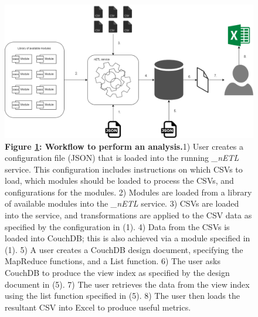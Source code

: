 \begin{figure}[ht]
    \centering
    \begin{mdframed}
        \centering
        \includegraphics[scale=0.35]{./resources/figures/analysis-workflow.png}
    \end{mdframed}
    \caption[Analysis Workflow]{\textbf{Figure \ref{analysis-workflow}: Workflow to perform an analysis.}1) User creates a configuration file (JSON) that is loaded into the running \textit{\_nETL} service. This configuration includes instructions on which CSVs to load, which modules should be loaded to process the CSVs, and configurations for the modules. 2) Modules are loaded from a library of available modules into the \textit{\_nETL} service. 3) CSVs are loaded into the service, and transformations are applied to the CSV data as specified by the configuration in (1). 4) Data from the CSVs is loaded into CouchDB; this is also achieved via a module specified in (1). 5) A user creates a CouchDB design document, specifying the MapReduce functions, and a List function. 6) The user asks CouchDB to produce the view index as specified by the design document in (5). 7) The user retrieves the data from the view index using the list function specified in (5). 8) The user then loads the resultant CSV into Excel to produce useful metrics.}
    \label{analysis-workflow}
\end{figure}





